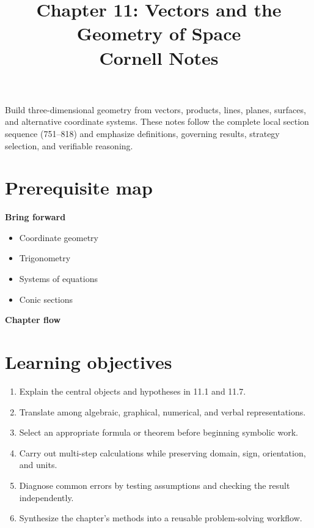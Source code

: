 \documentclass[11pt]{article}
\title{Chapter 11: Vectors and the Geometry of Space\\[2mm]\large Cornell Notes}
\author{}
\date{}
\begin{document}
\maketitle
\thispagestyle{fancy}
\begin{orientationbox}
Build three-dimensional geometry from vectors, products, lines, planes, surfaces, and alternative coordinate systems. These notes follow the complete local section sequence (751--818) and emphasize definitions, governing results, strategy selection, and verifiable reasoning.
\end{orientationbox}

\section{Prerequisite map}
\begin{minipage}[t]{0.42\textwidth}
\textbf{Bring forward}
\begin{itemize}
\item Coordinate geometry
\item Trigonometry
\item Systems of equations
\item Conic sections
\end{itemize}
\end{minipage}\hfill
\begin{minipage}[t]{0.54\textwidth}
\textbf{Chapter flow}
\begin{center}
\end{center}
\end{minipage}

\section{Learning objectives}
\begin{enumerate}
\item Explain the central objects and hypotheses in 11.1 and 11.7.
\item Translate among algebraic, graphical, numerical, and verbal representations.
\item Select an appropriate formula or theorem before beginning symbolic work.
\item Carry out multi-step calculations while preserving domain, sign, orientation, and units.
\item Diagnose common errors by testing assumptions and checking the result independently.
\item Synthesize the chapter's methods into a reusable problem-solving workflow.
\end{enumerate}
\end{document}
